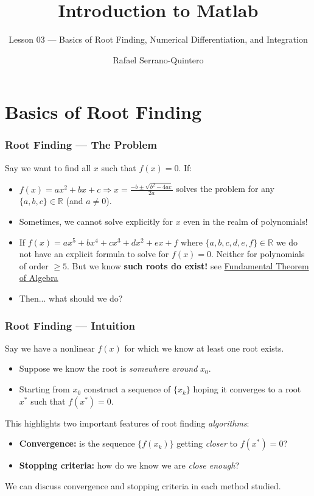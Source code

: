 \documentclass[11pt,xcolor={svgnames},aspectratio=169,usepdftitle=false]{beamer}
\title{Introduction to Matlab}
\subtitle{Lesson 03 --- Basics of Root Finding, Numerical Differentiation, and Integration}
\author{Rafael Serrano-Quintero}
\institute{Department of Economics \\ University of Barcelona}
\date{}
\begin{document}
\VerbatimFootnotes

\maketitle

\section{Basics of Root Finding}

\begin{frame}
  \frametitle{Root Finding --- The Problem}
Say we want to find all $x$ such that $f(x) = 0$. If:
\begin{itemize}
  \item $f(x) = ax^2 + bx + c \Rightarrow x = \frac{-b \pm \sqrt{b^2 - 4ac}}{2a}$ solves the problem for any $\{a,b,c\}\in\mathbb{R}$ {\tiny (and $a\neq 0$)}.
  \item Sometimes, we cannot solve explicitly for $x$ even in the realm of polynomials!
  \item If $f(x) = ax^5 + bx^4 + cx^3 + dx^2 + ex + f$ where $\{a,b,c,d,e,f\}\in\mathbb{R}$ we do not have an explicit formula to solve for $f(x) = 0$. Neither for polynomials of order $\geq 5$. But we know \alert{\textbf{such roots do exist!}} {\tiny see \href{https://en.wikipedia.org/wiki/Fundamental_theorem_of_algebra}{Fundamental Theorem of Algebra}}
  \item Then... what should we do?
\end{itemize}
\end{frame}

\begin{frame}
  \frametitle{Root Finding --- Intuition}
Say we have a nonlinear $f(x)$ for which we know at least one root exists.
\begin{itemize}
  \item Suppose we know the root is \textit{somewhere around} $x_0$.
  \item Starting from $x_0$ construct a sequence of $\{x_k\}$ hoping it converges to a root $x^*$ such that $f(x^*) = 0$.
\end{itemize}
This highlights two important features of root finding \textit{algorithms}:
\begin{itemize}
  \item \alert{\textbf{Convergence:}} is the sequence $\{f(x_k)\}$ getting \textit{closer} to $f(x^*) = 0$?
  \item \alert{\textbf{Stopping criteria:}} how do we know we are \textit{close enough}?
\end{itemize}
We can discuss convergence and stopping criteria in each method studied.
\end{frame}
\end{document}
